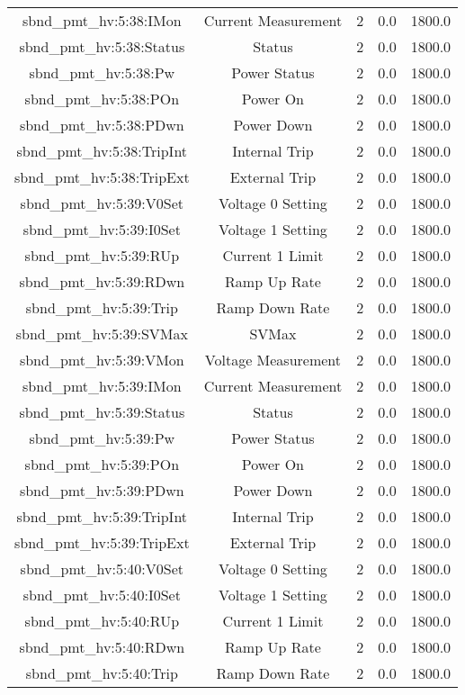 \begin{table}[ptb]
\begin{tabular}{c | c c c c}
sbnd_pmt_hv:5:38:IMon & Current Measurement & 2 & 0.0 & 1800.0\\ 
sbnd_pmt_hv:5:38:Status & Status & 2 & 0.0 & 1800.0\\ 
sbnd_pmt_hv:5:38:Pw & Power Status & 2 & 0.0 & 1800.0\\ 
sbnd_pmt_hv:5:38:POn & Power On & 2 & 0.0 & 1800.0\\ 
sbnd_pmt_hv:5:38:PDwn & Power Down & 2 & 0.0 & 1800.0\\ 
sbnd_pmt_hv:5:38:TripInt & Internal Trip & 2 & 0.0 & 1800.0\\ 
sbnd_pmt_hv:5:38:TripExt & External Trip & 2 & 0.0 & 1800.0\\ 
sbnd_pmt_hv:5:39:V0Set & Voltage 0 Setting & 2 & 0.0 & 1800.0\\ 
sbnd_pmt_hv:5:39:I0Set & Voltage 1 Setting & 2 & 0.0 & 1800.0\\ 
sbnd_pmt_hv:5:39:RUp & Current 1 Limit & 2 & 0.0 & 1800.0\\ 
sbnd_pmt_hv:5:39:RDwn & Ramp Up Rate & 2 & 0.0 & 1800.0\\ 
sbnd_pmt_hv:5:39:Trip & Ramp Down Rate & 2 & 0.0 & 1800.0\\ 
sbnd_pmt_hv:5:39:SVMax & SVMax & 2 & 0.0 & 1800.0\\ 
sbnd_pmt_hv:5:39:VMon & Voltage Measurement & 2 & 0.0 & 1800.0\\ 
sbnd_pmt_hv:5:39:IMon & Current Measurement & 2 & 0.0 & 1800.0\\ 
sbnd_pmt_hv:5:39:Status & Status & 2 & 0.0 & 1800.0\\ 
sbnd_pmt_hv:5:39:Pw & Power Status & 2 & 0.0 & 1800.0\\ 
sbnd_pmt_hv:5:39:POn & Power On & 2 & 0.0 & 1800.0\\ 
sbnd_pmt_hv:5:39:PDwn & Power Down & 2 & 0.0 & 1800.0\\ 
sbnd_pmt_hv:5:39:TripInt & Internal Trip & 2 & 0.0 & 1800.0\\ 
sbnd_pmt_hv:5:39:TripExt & External Trip & 2 & 0.0 & 1800.0\\ 
sbnd_pmt_hv:5:40:V0Set & Voltage 0 Setting & 2 & 0.0 & 1800.0\\ 
sbnd_pmt_hv:5:40:I0Set & Voltage 1 Setting & 2 & 0.0 & 1800.0\\ 
sbnd_pmt_hv:5:40:RUp & Current 1 Limit & 2 & 0.0 & 1800.0\\ 
sbnd_pmt_hv:5:40:RDwn & Ramp Up Rate & 2 & 0.0 & 1800.0\\ 
sbnd_pmt_hv:5:40:Trip & Ramp Down Rate & 2 & 0.0 & 1800.0\\ 

\end{tabular}
\end{table}
